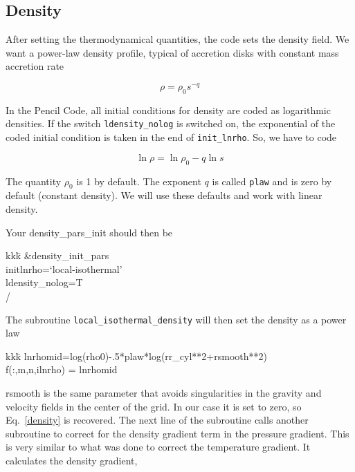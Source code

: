 \documentclass[a4paper,10pt]{article}
\newcommand{\pencilcode}{{\sc Pencil Code}}
\begin{document}
\subsection{Density}

After setting the thermodynamical quantities, the code sets the density field. We want a power-law density profile, typical of accretion disks with constant mass accretion rate

\begin{equation}
\label{density}
 \rho = \rho_0 s^{-q}
\end{equation}

In the \pencilcode, all initial conditions for density are coded as logarithmic densities. If the switch {\tt ldensity\_nolog} is switched on, the exponential of the coded initial condition is taken in the end of {\tt init\_lnrho}. So, we have to code 

\begin{equation}
\ln \rho = \ln \rho_0 - q \ln s 
\end{equation}

The quantity $\rho_0$ is 1 by default. The exponent $q$ is called {\tt plaw} and is zero by default (constant density). We will use these defaults and work with linear density. 

Your density\_pars\_init should then be 

{\tt \begin{tabbing}
  kkk\=\kill
\&density\_init\_pars\\
  \>initlnrho=`local-isothermal'\\
  \>ldensity\_nolog=T\\
/
\end{tabbing}}

The subroutine {\tt local\_isothermal\_density} will then set the density as a power law 

{\tt \begin{tabbing}
  kkk\=\kill
 \>         lnrhomid=log(rho0)-.5*plaw*log(rr\_cyl**2+rsmooth**2)\\
 \>         f(:,m,n,ilnrho) = lnrhomid 
\end{tabbing}}rsmooth is the same parameter that avoids singularities in the gravity and velocity fields in the center of the grid. In our case it is set to zero, so Eq.~\ref{density} is recovered. The next line of the subroutine calls another subroutine to correct for the density gradient term in the pressure gradient. This is very similar to what was done to correct the temperature gradient. It calculates the density gradient, 
\end{document}
